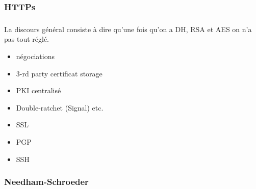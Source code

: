\documentclass[
hyperref={pdfpagelabels=false}
,xcolor=table
]
{beamer}
\begin{document}
\begin{frame}
  \frametitle{HTTPs}
\end{frame}


\begin{frame}
  \frametitle{}
  La discours général consiste à dire qu'une fois qu'on a DH, RSA et AES on n'a pas tout réglé.
  \begin{itemize}
  \item négociations
  \item 3-rd party certificat storage
  \item PKI centralisé
  \item Double-ratchet (Signal) etc. 
  \item SSL
  \item PGP
  \item SSH
  \end{itemize}
\end{frame}


\begin{frame}
  \frametitle{}
\end{frame}

\begin{frame}
  \frametitle{Needham-Schroeder}
\end{frame}
\end{document}
